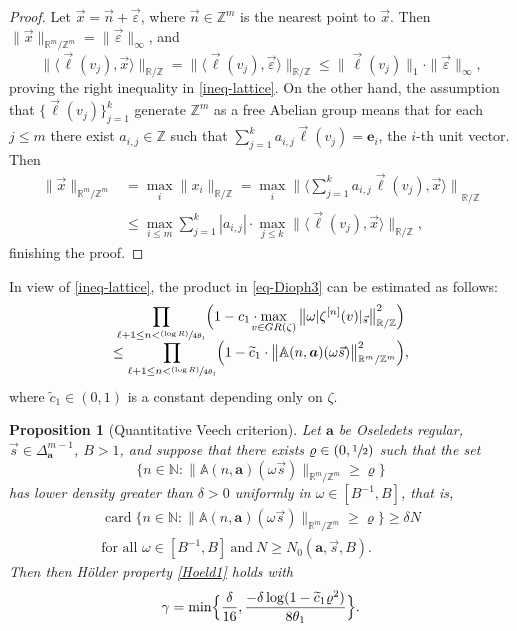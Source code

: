 \documentclass[10pt]{amsart}
\newcommand{\sep}{:}
\newcommand\shalf{\sfrac{1}{2}}
\newcommand{\psfrac}[2]{\sfrac{(#1)}{#2}}
\let\epsilon\varepsilon
\theoremstyle{plain}
\newtheorem{prop}[theorem]{Proposition}
\theoremstyle{definition}
\let\wt\widetilde
\DeclareMathOperator{\card}{card}
\newcommand\bom{{\boldsymbol a}}\let\ba\bom
\newcommand\eb{{\boldsymbol e}}
\let\gam\gamma
\let\om\omega
\newcommand\Aa{\mathbb{A}}
\newcommand{\R}{\mathbb{R}}
\newcommand{\Z}{\mathbb{Z}}
\newcommand{\N}{\mathbb{N}}
\newcommand\be{\begin{equation}}
\newcommand\ee{\end{equation}}
\begin{document}
\begin{proof}
Let $\vec{x} = \vec{n} + \vec{\epsilon}$, where $\vec n\in \Z^m$ is the nearest point to $\vec x$. Then $\|\vec x\|_{\R^m/\Z^m}= \|\vec{\epsilon}\|_\infty$, and
\[
\|\langle \vec\ell(v_j), \vec{x}\rangle \|_{\R/\Z} = \|\langle \vec\ell(v_j), \vec{\epsilon}\rangle \|_{\R/\Z} \le \|\vec\ell(v_j)\|_1\cdot \|\vec{\epsilon}\|_\infty,
\]
proving the right inequality in \eqref{ineq-lattice}. On the other hand, the assumption that $\{\vec\ell(v_j)\}_{j=1}^k$ generate $\Z^m$ as a free Abelian group means that for each $j\le m$ there exist $a_{i,j}\in \Z$ such that $\sum_{j=1}^k a_{i,j} \vec\ell(v_j) = \eb_i$, the $i$-th unit vector. Then
\begin{align*}
\|\vec{x}\|_{\R^m/\Z^m} &= \max_i \|x_i\|_{\R/\Z} = \max_i {\bigl\|\bigl\langle\textstyle\sum_{j=1}^k a_{i,j} \vec\ell(v_j), \vec x \bigr\rangle \bigr\|}_{\R/\Z}\\[-5pt]
&\le \max_{i\le m}\sum_{j=1}^k |a_{i,j}| \cdot
\max_{j\le k} \|\langle \vec\ell(v_j), \vec{x}\rangle \|_{\R/\Z},
\end{align*}
finishing the proof.
\end{proof}

In view of \eqref{ineq-lattice}, the product in \eqref{eq-Dioph3} can be estimated as follows:
\begin{multline}
\label{lattice}
\prod_{\ell+1\le n < \psfrac{\log R}{4\theta_1}}
\Bigl( 1 - c_1\cdot \!\!\!\! \max_{v\in GR(\zeta)}{\bigl\| \om|\zeta^{[n]}(v)|_{\vec{s}}\bigr\|}^2_{\R/\Z}\Bigr)\\[-5pt]
\le \prod_{\ell+1 \le n < \psfrac{\log R}{4\theta_1}} \Bigl( 1 - \wt c_1\cdot \bigl\|\Aa(n,\bom) (\om\vec{s})\bigr\|^2_{\R^m/\Z^m} \Bigr),
\end{multline}
where $\wt c_1\in (0,1)$ is a constant depending only on $\zeta$.

\begin{prop}[Quantitative Veech criterion] \label{prop-quant}
Let $\bom$ be Oseledets regular, $\vec s\in \Delta_{\bom}^{m-1}$, $B>1$, and suppose that there exists $\varrho\in (0,\shalf)$ such that the set
\[
\bigl\{n\in \N\sep \big\|\Aa(n,\bom) (\om\vec{s})\bigr\|_{\R^m/\Z^m} \ge \varrho\bigr\}
\]
has lower density greater than $\delta>0$ uniformly in $\om\in [B^{-1},B]$, that is,
\begin{multline}
\label{eq-densi}
\card \bigl\{n\in \N\sep \big\|\Aa(n,\bom) (\om\vec{s})\bigr\|_{\R^m/\Z^m} \ge \varrho\bigr\} \ge \delta N\\
\text{for all }\om\in [B^{-1},B]\ \text{and}\ N \ge N_0(\bom,\vec s, B).
\end{multline}
Then then Hölder property \eqref{Hoeld1} holds with
\be \label{def-gamma}
\gam= \min\Bigl\{\frac{\delta}{16},\frac{-\delta\log(1-\wt c_1\varrho^2)}{8\theta_1}\Bigr\}.
\ee
\end{prop}
\end{document}
